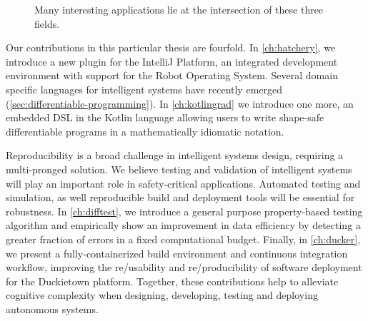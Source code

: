 \begin{figure}
    \caption{Many interesting applications lie at the intersection of these three fields.}
    \label{fig:venn_triagram}
\end{figure}

Our contributions in this particular thesis are fourfold. In \autoref{ch:hatchery}, we introduce a new plugin for the IntelliJ Platform, an integrated development environment with support for the Robot Operating System. Several domain specific languages for intelligent systems have recently emerged (\autoref{sec:differentiable-programming}). In \autoref{ch:kotlingrad} we introduce one more, an embedded DSL in the Kotlin language allowing users to write shape-safe differentiable programs in a mathematically idiomatic notation.

Reproducibility is a broad challenge in intelligent systems design, requiring a multi-pronged solution. We believe testing and validation of intelligent systems will play an important role in safety-critical applications. Automated testing and simulation, as well reproducible build and deployment tools will be essential for robustness. In \autoref{ch:difftest}, we introduce a general purpose property-based testing algorithm and empirically show an improvement in data efficiency by detecting a greater fraction of errors in a fixed computational budget. Finally, in \autoref{ch:ducker}, we present a fully-containerized build environment and continuous integration workflow, improving the re/usability and re/producibility of software deployment for the Duckietown platform. Together, these contributions help to alleviate cognitive complexity when designing, developing, testing and deploying autonomous systems.